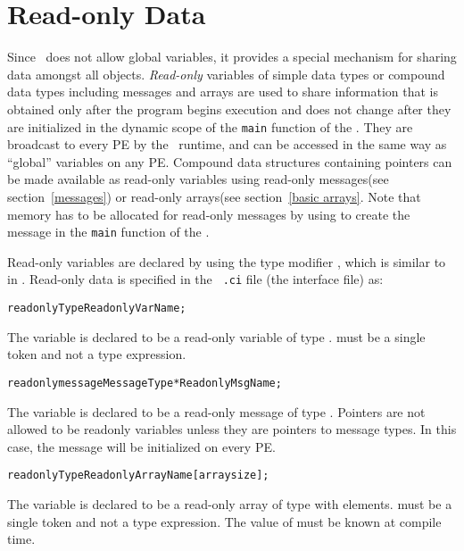 \section{Read-only Data}
\label{readonly}

Since \charmpp\ does not allow global variables,
it provides a special mechanism for sharing
data amongst all objects. {\it Read-only} variables of simple data types or
compound data types including messages and arrays are used to share information
that is obtained only after the program begins execution and does not change
after they are initialized in the dynamic scope of the {\tt main} function of
the . They are broadcast to every PE by the \charmpp\ runtime,
and can be accessed in the same way as \CC ``global'' variables on any PE.
Compound data structures containing pointers can be made available as read-only
variables using read-only messages(see section~\ref{messages}) or read-only arrays(see section~\ref{basic arrays}.  Note that memory
has to be allocated for read-only messages by using  to create the
message in the {\tt main} function of the . 

Read-only variables are declared by using the type modifier ,
which is similar to  in \CC. Read-only data is specified in the {\tt
.ci} file (the interface file) as: 

\begin{alltt}
 readonly Type ReadonlyVarName;
\end{alltt}

The variable  is declared to be a read-only variable of
type .  must be a single token and not a type expression.

\begin{alltt}
 readonly message MessageType *ReadonlyMsgName;
\end{alltt}

The variable  is declared to be a read-only message of type
. Pointers are not allowed to be readonly variables unless they
are pointers to message types. In this case, the message will be initialized on
every PE.

\begin{alltt}
 readonly Type ReadonlyArrayName [arraysize];
\end{alltt}

The variable  is declared to be a read-only array of type
 with  elements.  must be a single token and
not a type expression. The value of  must be known at compile
time.

